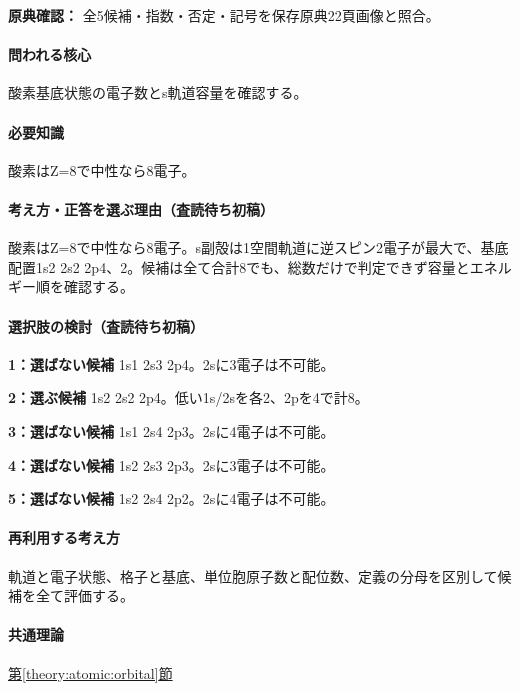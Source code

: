 \noindent\textbf{原典確認：} 全5候補・指数・否定・記号を保存原典22頁画像と照合。\par

\paragraph{問われる核心} 酸素基底状態の電子数とs軌道容量を確認する。

\paragraph{必要知識} 酸素はZ=\allowbreak{}8で中性なら8電子。

\paragraph{考え方・正答を選ぶ理由（査読待ち初稿）} 酸素はZ=\allowbreak{}8で中性なら8電子。s副殻は1空間軌道に逆スピン2電子が最大で、基底配置1s2 2s2 2p4、2。候補は全て合計8でも、総数だけで判定できず容量とエネルギー順を確認する。

\paragraph{選択肢の検討（査読待ち初稿）}\mbox{}\par

\noindent\textbf{1：選ばない候補} 1s1 2s3 2p4。2sに3電子は不可能。\par

\noindent\textbf{2：選ぶ候補} 1s2 2s2 2p4。低い1s/2sを各2、2pを4で計8。\par

\noindent\textbf{3：選ばない候補} 1s1 2s4 2p3。2sに4電子は不可能。\par

\noindent\textbf{4：選ばない候補} 1s2 2s3 2p3。2sに3電子は不可能。\par

\noindent\textbf{5：選ばない候補} 1s2 2s4 2p2。2sに4電子は不可能。\par

\paragraph{再利用する考え方} 軌道と電子状態、格子と基底、単位胞原子数と配位数、定義の分母を区別して候補を全て評価する。

\paragraph{共通理論} \hyperref[theory:atomic:orbital]{第\ref*{theory:atomic:orbital}節}

